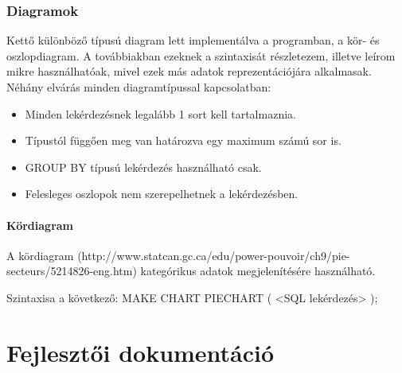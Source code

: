 \documentclass{elteikthesis}
\begin{document}
\subsection{Diagramok}
Kettő különböző típusú diagram lett implementálva a programban, a kör- és oszlopdiagram. A továbbiakban
ezeknek a szintaxisát részletezem, illetve leírom mikre használhatóak, mivel ezek más adatok
reprezentációjára alkalmasak.
Néhány elvárás minden diagramtípussal kapcsolatban:
\begin{itemize}
  \item Minden lekérdezésnek legalább 1 sort kell tartalmaznia.
  \item Típustól függően meg van határozva egy maximum számú sor is.
  \item GROUP BY típusú lekérdezés használható csak.
  \item Felesleges oszlopok nem szerepelhetnek a lekérdezésben.
\end{itemize}

\subsubsection{Kördiagram}
A kördiagram (http://www.statcan.gc.ca/edu/power-pouvoir/ch9/pie-secteurs/5214826-eng.htm) kategórikus
adatok megjelenítésére használható.

Szintaxisa a következő:
MAKE CHART PIECHART ( <SQL lekérdezés> );

\chapter{Fejlesztői dokumentáció}
\end{document}
